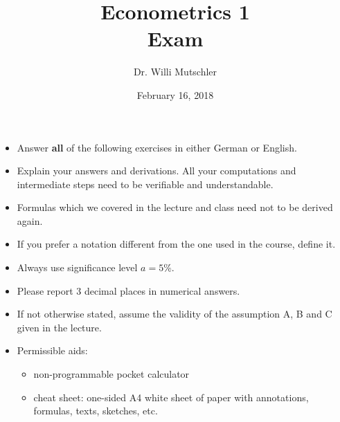 \documentclass{article}
\begin{document}
	
	\title{Econometrics 1 \\ \small Exam}
	\author{Dr. Willi Mutschler}
	\date{February 16, 2018}
	\maketitle
	
	\begin{itemize}
		\item Answer \textbf{all} of the following exercises in either German or English.
		\item Explain your answers and derivations. All your computations and intermediate steps need to be verifiable and understandable. 
		\item Formulas which we covered in the lecture and class need not to be derived again.
		\item If you prefer a notation different from the one used in the course, define it.
		\item Always use significance level $a=5\%$.
		\item Please report 3 decimal places in numerical answers.
		\item If not otherwise stated, assume the validity of the assumption A, B and C given in the lecture.
		\item Permissible aids:
		\begin{itemize}
			\item non-programmable pocket calculator
			\item cheat sheet: one-sided A4 white sheet of paper with annotations, formulas, texts, sketches, etc.
		\end{itemize}
	\end{itemize}
\thispagestyle{empty}

\newpage
\end{document}
